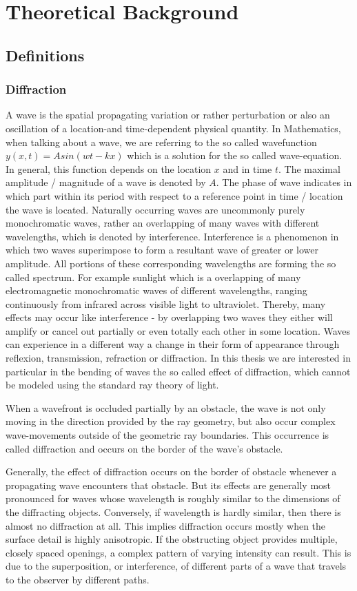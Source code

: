 \chapter{Theoretical Background}
\section{Definitions}
\subsection{Diffraction}
A wave is the spatial propagating variation or rather perturbation or also an oscillation of a location-and time-dependent physical quantity. In Mathematics, when talking about a wave, we are referring to the so called wavefunction  $y(x,t) = A sin(wt - kx)$ which is a solution for the so called wave-equation. In general, this function depends on the location $x$ and in time $t$. The maximal amplitude / magnitude of a wave is denoted by $A$. The phase of wave indicates in which part within its period with respect to a reference point in time / location the wave is located.
Naturally occurring waves are uncommonly purely monochromatic waves, rather an overlapping of many waves with different wavelengths, which is denoted by interference. Interference  is a phenomenon in which two waves superimpose to form a resultant wave of greater or lower amplitude. All portions of these corresponding wavelengths are forming the so called spectrum. For example sunlight which is a overlapping of many electromagnetic monochromatic waves of different wavelengths, ranging continuously from infrared across visible light to ultraviolet. Thereby, many effects may occur like interference - by overlapping two waves they either will amplify or cancel out partially or even totally each other in some location.
Waves can experience in a different way a change in their form of appearance through reflexion, transmission, refraction or diffraction. In this thesis we are interested in particular in the bending of waves the so called effect of diffraction, which cannot be modeled using the standard ray theory of light.

When a wavefront is occluded partially by an obstacle, the wave is not only moving in the direction provided by the ray geometry, but also occur complex wave-movements outside of the geometric ray boundaries. This occurrence is called diffraction and occurs on the border of the wave's obstacle. 

Generally, the effect of diffraction occurs on the border of obstacle whenever a propagating wave encounters that obstacle. But its effects are generally most pronounced for waves whose wavelength is roughly similar to the dimensions of the diffracting objects. Conversely, if wavelength is hardly similar, then there is almost no diffraction at all. 
This implies diffraction occurs mostly when the surface detail is highly anisotropic. If the obstructing object provides multiple, closely spaced openings, a complex pattern of varying intensity can result. This is due to the superposition, or interference, of different parts of a wave that travels to the observer by different paths.

